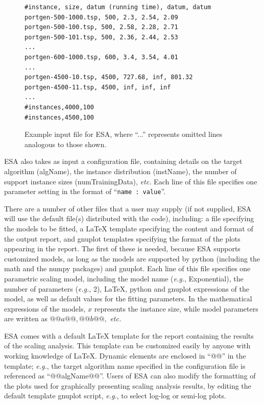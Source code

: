 \documentclass[aic]{iosart2x}
\newcommand{\eg}{\emph{e.g.}}
\begin{document}
\begin{figure}[t]
\begin{lstlisting}[basicstyle={\scriptsize\ttfamily}]
#instance, size, datum (running time), datum, datum
portgen-500-1000.tsp, 500, 2.3, 2.54, 2.09
portgen-500-100.tsp, 500, 2.58, 2.28, 2.71
portgen-500-101.tsp, 500, 2.36, 2.44, 2.53
...
portgen-600-1000.tsp, 600, 3.4, 3.54, 4.01
...
portgen-4500-10.tsp, 4500, 727.68, inf, 801.32
portgen-4500-11.tsp, 4500, inf, inf, inf
...
#instances,4000,100
#instances,4500,100
\end{lstlisting}
\vspace*{-3mm}
\caption{Example input file for ESA, where ``...'' represents omitted lines analogous to those shown.}\label{fig:Excerpt-ESA-input}
\end{figure}

ESA also takes as input a configuration file, containing details on the target algorithm (algName), the instance distribution (instName), the number of support instance sizes (numTrainingData), \emph{etc.}  Each line of this file specifies one parameter setting in the format of  ``\lstinline[basicstyle={\ttfamily}]!name : value!''.

There are a number of other files that a user may supply (if not supplied, ESA will use the default file(s) distributed with the code), including: a file specifying the models to be fitted, a {\LaTeX} template specifying the content and format of the output report, and gnuplot templates specifying the format of the plots appearing in the report. The first of these is needed, because ESA supports customized models, as long as the models are supported by python (including the math and the numpy packages) and gnuplot. Each line of this file specifies one parametric scaling model,  including the model name (\eg{}, Exponential), the number of parameters (\eg{}, 2), {\LaTeX}, python and gnuplot expressions of the model, as well as default values for the fitting parameters. In the mathematical expressions of the models, $x$ represents the instance size, while model parameters are written as $@@a@@, @@b@@,$ \emph{etc.}


ESA comes with a default {\LaTeX} template for the report containing the results of the scaling analysis. This template can be customized easily by anyone with working knowledge of \LaTeX. Dynamic elements are enclosed in ``@@'' in the template; \eg{}, the target algorithm name specified in the configuration file is referenced as ``@@algName@@''. Users of ESA can also modify the formatting of the plots used for graphically presenting scaling analysis results, by editing the default template gnuplot script, \eg{}, to select log-log or semi-log plots.
\end{document}

